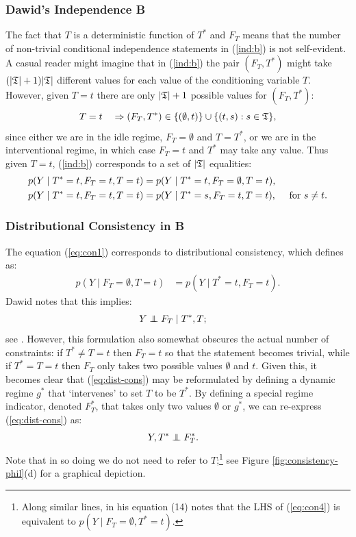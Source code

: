\documentclass[11pt]{article}
\newcommand\indep{\protect\mathpalette{\protect\independenT}{\perp}}
\def\independenT#1#2{\mathrel{\rlap{$#1#2$}\mkern2.5mu{#1#2}}}
\begin{document}
{\subsubsection{Dawid's Independence B}
The fact that $T$ is a deterministic function of $T^*$ and $F_T$ means that the number of non-trivial conditional independence statements in (\ref{ind:b})  is not self-evident. A casual reader might imagine that in (\ref{ind:b}) the pair $(F_T, T^*)$ might take $(|\frak{T}|+1)|\frak{T}|$ different values for each value of the conditioning variable $T$. However, given $T=t$ there are only $|\frak{T}|+1$ possible values for $(F_T, T^*)$:
\[
T=t \quad \Rightarrow (F_T,T^*) \in \{(\emptyset, t)\} \cup \{ (t,s) : s \in \frak{T}\},
\]
since either we are in the idle regime, $F_T=\emptyset$ and $T=T^*$, or we are in the interventional regime, in which case $F_T=t$ and $T^*$ may take any value.
Thus given $T=t$, (\ref{ind:b}) corresponds to a set of $|\frak{T}|$ equalities:
\begin{align}
p(Y \mid T^*=t,F_T=t, T=t) &= p(Y \mid T^*=t,F_T=\emptyset, T=t),\label{eq:con1}\\
p(Y \mid T^*=t,F_T=t, T=t) &= p(Y \mid T^*=s,F_T=t, T=t),\quad \hbox{ for }s \neq t.\label{eq:ignor1}
\end{align}

\subsubsection*{Distributional Consistency in B} 
The equation (\ref{eq:con1}) corresponds to distributional consistency, which \citet[Eq.(14)]{dawid:2021} defines as:
\begin{align}
p(Y \mid F_T=\emptyset, T=t) &= p(Y \mid T^*=t,F_T=t).\label{eq:con4}
\end{align}
Dawid notes that this implies:
\begin{align}
Y&\indep F_T\mid T^*, T;\label{eq:dist-cons}
\end{align}
see \citet[Lemma 1]{dawid:2021}. However, this formulation also somewhat obscures the actual number of constraints: if $T^*\neq T=t$ then $F_T=t$ so that the statement becomes trivial, while if $T^*=T=t$ then $F_T$ only takes two possible values $\emptyset$ and $t$. Given this, it becomes clear that (\ref{eq:dist-cons}) may be reformulated by defining a dynamic regime $g^*$ that `intervenes' to set $T$ to be $T^*$. By defining a special regime indicator, denoted $F^*_T$, that takes only two values $\emptyset$ or $g^*$, we can re-express (\ref{eq:dist-cons}) as:
\begin{align}
Y, T^*&\indep F^*_T.\label{eq:dist-cons2}
\end{align}
Note that in so doing we do not need to refer to $T$;\footnote{Along similar lines, in his equation (14) \citet{dawid:2021} notes that the LHS of
(\ref{eq:con4}) is equivalent to $p(Y \mid F_T=\emptyset, T^*=t)$.}  see Figure \ref{fig:consistency-phil}(d) for a graphical depiction.

}
\end{document}

